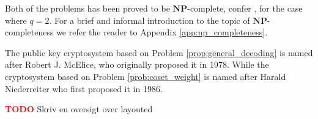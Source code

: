 Both of the problems has been proved to be $\mathbf{NP}$-complete, confer \cite{general_decoding_problem_is_np}, for the case where $q = 2$. For a brief and informal introduction to the topic of $\mathbf{NP}$-completeness we refer the reader to Appendix \ref{app:np_completeness}.

The public key cryptosystem based on Problem \ref{prop:general_decoding} is named after Robert J. McElice, who originally proposed it in 1978. While the cryptosystem based on Problem \ref{prob:coset_weight} is named after Harald Niederreiter who first proposed it in 1986.


\textcolor{red}{\textbf{TODO}} Skriv en oversigt over layouted
